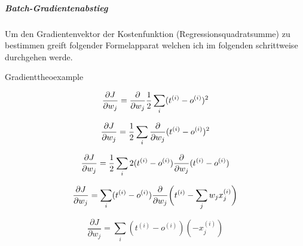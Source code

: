 \subparagraph{Batch-Gradientenabstieg}
Um den Gradientenvektor der Kostenfunktion (Regressionsquadratsumme) zu bestimmen greift folgender Formelapparat welchen ich im folgenden schrittweise durchgehen werde.

\vspace{2 mm}
\begin{minipage}{\textwidth}
\begin{myderivation}{Gradient}{theoexample}

\begin{equation} \label{eq:gr1}
\frac{\partial J}{\partial w_j} = \frac{\partial }{\partial w_j} \frac{1}{2} \sum_i  (t^{(i)} - o^{(i)})^2 \\
\end{equation}

\begin{equation} \label{eq:gr2}
\frac{\partial J}{\partial w_j} = \frac{1}{2} \sum_i \frac{\partial}{\partial w_j} (t^{(i)} - o^{(i)})^2 \\
\end{equation}

\begin{equation} \label{eq:gr3}
\frac{\partial J}{\partial w_j} = \frac{1}{2} \sum_i 2 (t^{(i)} - o^{(i)}) \frac{\partial}{\partial w_j} (t^{(i)} - o^{(i)}) \\
\end{equation}

\begin{equation} \label{eq:gr4}
\frac{\partial J}{\partial w_j} = \sum_i (t^{(i)} - o^{(i)}) \frac{\partial}{\partial w_j} \bigg(t^{(i)} - \sum_j w_j x^{(i)}_{j}\bigg) \\
\end{equation}

\begin{equation} \label{eq:gr5}
\frac{\partial J}{\partial w_j} = \sum_i  (t^{(i)} - o^{(i)})(-x^{(i)}_{j})
\end{equation}

\end{myderivation}
\end{minipage}


